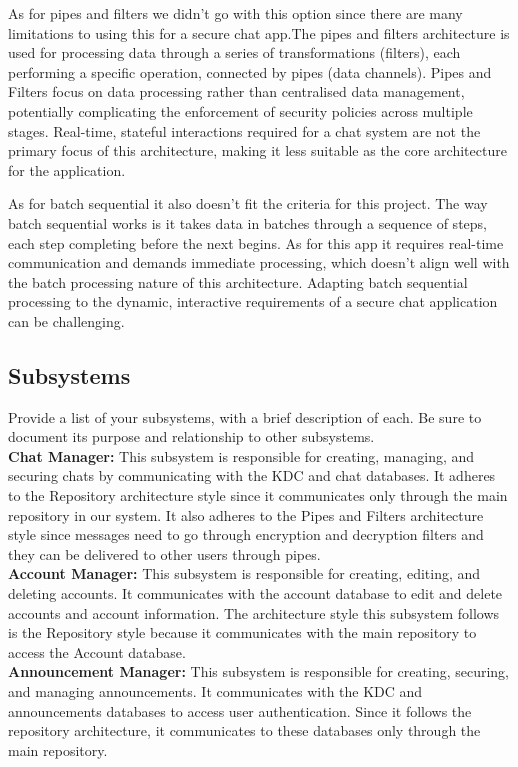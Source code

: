 \documentclass[]{article}
\begin{document}
As for pipes and filters we didn’t go with this option since there are many limitations to using this for a secure chat app.The pipes and filters architecture is used for processing data through a series of transformations (filters), each performing a specific operation, connected by pipes (data channels). Pipes and Filters focus on data processing rather than centralised data management, potentially complicating the enforcement of security policies across multiple stages. Real-time, stateful interactions required for a chat system are not the primary focus of this architecture, making it less suitable as the core architecture for the application.
\medskip

As for batch sequential it also doesn’t fit the criteria for this project. The way batch sequential works is it takes data in batches through a sequence of steps, each step completing before the next begins. As for this app it requires real-time communication and demands immediate processing, which doesn’t align well with the batch processing nature of this architecture. Adapting batch sequential processing to the dynamic, interactive requirements of a secure chat application can be challenging.


\subsection{Subsystems}
\label{sub:subsystems}
Provide a list of your subsystems, with a brief description of each. Be sure to document its purpose and relationship to other subsystems.\\[12pt]
\textbf{Chat Manager:} This subsystem is responsible for creating, managing, and securing chats by communicating with the KDC and chat databases. It adheres to the Repository architecture style since it communicates only through the main repository in our system. It also adheres to the Pipes and Filters architecture style since messages need to go through encryption and decryption filters and they can be delivered to other users through pipes. \\[12pt]
\textbf{Account Manager:} This subsystem is responsible for creating, editing, and deleting accounts. It communicates with the account database to edit and delete accounts and account information. The architecture style this subsystem follows is the Repository style because it communicates with the main repository to access the Account database.\\[12pt]
\textbf{Announcement Manager:} This subsystem is responsible for creating, securing, and managing announcements. It communicates with the KDC and announcements databases to access user authentication. Since it follows the repository architecture, it communicates to these databases only through the main repository.
\end{document}
